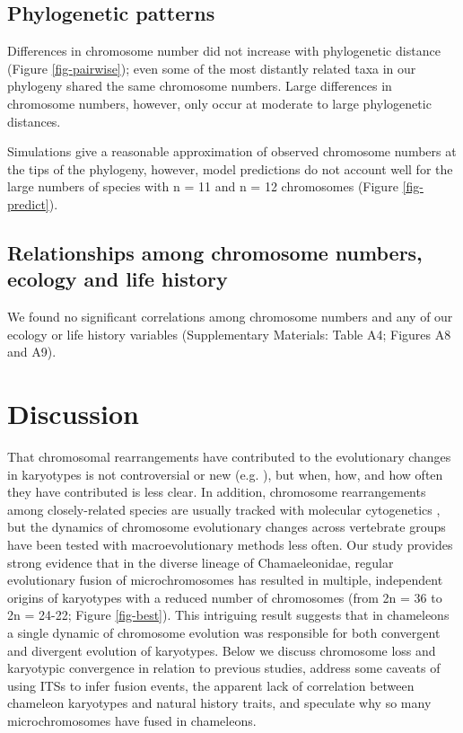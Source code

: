 \documentclass[a4paper, 12pt]{article}
\begin{document}
\subsection{Phylogenetic patterns}
Differences in chromosome number did not increase with phylogenetic distance (Figure \ref{fig-pairwise}); even some of the most distantly related taxa in our phylogeny shared the same chromosome numbers. 
Large differences in chromosome numbers, however, only occur at moderate to large phylogenetic distances. 

Simulations give a reasonable approximation of observed chromosome numbers at the tips of the phylogeny, however, model predictions do not account well for the large numbers of species with n = 11 and n = 12 chromosomes (Figure \ref{fig-predict}).

\subsection{Relationships among chromosome numbers, ecology and life history}
We found no significant correlations among chromosome numbers and any of our ecology or life history variables (Supplementary Materials: Table A4; Figures A8 and A9). 

\section{Discussion}

That chromosomal rearrangements have contributed to the evolutionary changes in karyotypes is not controversial or new (e.g. \citealt{deakin2016anchoring}), but when, how, and how often they have contributed is less clear. 
In addition, chromosome rearrangements among closely-related species are usually tracked with molecular cytogenetics \citep{lisachov2021whole}, but the dynamics of chromosome evolutionary changes across vertebrate groups have been tested with macroevolutionary methods less often. 
Our study provides strong evidence that in the diverse lineage of Chamaeleonidae, regular evolutionary fusion of microchromosomes has resulted in multiple, independent origins of karyotypes with a reduced number of chromosomes (from 2n = 36 to 2n = 24-22; Figure \ref{fig-best}). 
This intriguing result suggests that in chameleons a single dynamic of chromosome evolution was responsible for both convergent and divergent evolution of karyotypes. 
Below we discuss chromosome loss and karyotypic convergence in relation to previous studies, address some caveats of using ITSs to infer fusion events, the apparent lack of correlation between chameleon karyotypes and natural history traits, and speculate why so many microchromosomes have fused in chameleons.    
\end{document}
